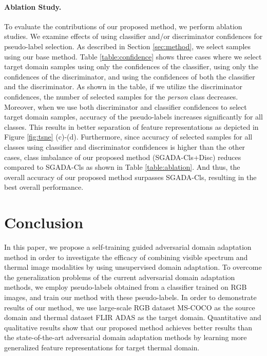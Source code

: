 \documentclass[final]{cvpr}
\begin{document}
\paragraph{Ablation Study.} To evaluate the contributions of our proposed method, we perform ablation studies. We examine effects of using classifier and/or discriminator confidences for pseudo-label selection. As described in Section \ref{sec:method}, we select samples using our base method. Table \ref{table:confidence} shows three cases where we select target domain samples using only the confidences of the classifier, using only the confidences of the discriminator, and using the confidences of both the classifier and the discriminator. As shown in the table, if we utilize the discriminator confidences, the number of selected samples for the \textit{person} class decreases. Moreover, when we use both discriminator and classifier confidences to select target domain samples, accuracy of the pseudo-labels increases significantly for all classes. This results in better separation of feature representations as depicted in Figure \ref{fig:tsne} (c)-(d). Furthermore, since accuracy of selected samples for all classes using classifier and discriminator confidences is higher than the other cases, class imbalance of our proposed method (SGADA-Cls+Disc) reduces compared to SGADA-Cls as shown in Table \ref{table:ablation}. And thus, the overall accuracy of our proposed method surpasses SGADA-Cls, resulting in the best overall performance.
\vspace{-2mm}

\section{Conclusion}

In this paper, we propose a self-training guided adversarial domain adaptation method in order to investigate the efficacy of combining visible spectrum and thermal image modalities by using unsupervised domain adaptation. To overcome the generalization problems of the current adversarial domain adaptation methods, we employ pseudo-labels obtained from a classifier trained on RGB images, and train our method with these pseudo-labels. In order to demonstrate results of our method, we use large-scale RGB dataset MS-COCO as the source domain and thermal dataset FLIR ADAS as the target domain. Quantitative and qualitative results show that our proposed method achieves better results than the state-of-the-art adversarial domain adaptation methods by learning more generalized feature representations for target thermal domain.


{\small


}
\end{document}
